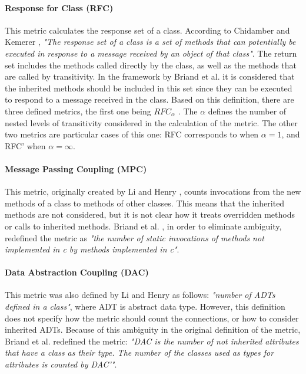 \paragraph{Response for Class (RFC)} This metric calculates the response set of a class. According to Chidamber and Kemerer \cite{chidamber1994metrics}, \textit{"The response set of a class is a set of methods that can potentially be executed in response to a message received by an object of that class"}. The return set includes the methods called directly by the class, as well as the methods that are called by transitivity. In the framework by Briand et al. \cite{briand1999unified} it is considered that the inherited methods should be included in this set since they can be executed to respond to a message received in the class. Based on this definition, there are three defined metrics, the first one being $RFC_\alpha$ \cite{churcher1995towards}. The $\alpha$ defines the number of nested levels of transitivity considered in the calculation of the metric. The other two metrics are particular cases of this one: RFC corresponds to when $\alpha = 1$, and RFC' when $\alpha = \infty$.

\paragraph{Message Passing Coupling (MPC)} This metric, originally created by Li and Henry \cite{li1993object}, counts invocations from the new methods of a class to methods of other classes. This means that the inherited methods are not considered, but it is not clear how it treats overridden methods or calls to inherited methods. Briand et al. \cite{briand1999unified}, in order to eliminate ambiguity, redefined the metric as \textit{"the number of static invocations of methods not implemented in c by methods implemented in c"}.

\paragraph{Data Abstraction Coupling (DAC)} This metric was also defined by Li and Henry \cite{li1993object} as follows: \textit{"number of ADTs defined in a class"}, where ADT is abstract data type. However, this definition does not specify how the metric should count the connections, or how to consider inherited ADTs. Because of this ambiguity in the original definition of the metric, Briand et al. \cite{briand1999unified} redefined the metric: \textit{"DAC is the number of not inherited attributes that have a class as their type. The number of the classes used as types for attributes is counted by DAC'"}.

